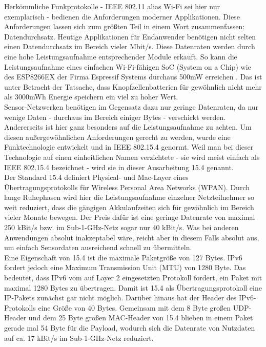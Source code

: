 Herkömmliche Funkprotokolle - IEEE 802.11 alias Wi-Fi sei hier nur exemplarisch - bedienen die Anforderungen moderner Applikationen. Diese Anforderungen lassen sich zum größten Teil in einem Wort zusammenfassen: Datendurchsatz. Heutige Applikationen für Endanwender benötigen nicht selten einen Datendurchsatz im Bereich vieler Mbit/s. Diese Datenraten werden durch eine hohe Leistungsaufnahme entsprechender Module erkauft. So kann die Leistungsaufnahme eines einfachen Wi-Fi-fähigen SoC (System on a Chip) wie des ESP8266EX der Firma Espressif Systems durchaus 500mW erreichen \cite{esp8266}. Das ist unter Betracht der Tatsache, dass Knopfzellenbatterien für gewöhnlich nicht mehr als 3000mWh Energie speichern ein viel zu hoher Wert. \\
Sensor-Netzwerken benötigen im Gegensatz dazu nur geringe Datenraten, da nur wenige Daten - durchaus im Bereich einiger Bytes - verschickt werden. Andererseits ist hier ganz besonders auf die Leistungsaufnahme zu achten. Um diesen außergewöhnlichen Anforderungen gerecht zu werden, wurde eine Funktechnologie entwickelt und in IEEE 802.15.4 genormt. Weil man bei dieser Technologie auf einen einheitlichen Namen verzichtete - sie wird meist einfach als IEEE 802.15.4 bezeichnet - wird sie in dieser Ausarbeitung 15.4 genannt. \\
Der Standard 15.4 definiert Physical- und Mac-Layer eines Übertragungsprotokolls für Wireless Personal Area Networks (WPAN). Durch lange Ruhephasen wird hier die Leistungsaufnahme einzelner Netzteilnehmer so weit reduziert, dass die gängigen Akkulaufzeiten sich für gewöhnlich im Bereich vieler Monate bewegen. Der Preis dafür ist eine geringe Datenrate von maximal 250 kBit/s bzw. im Sub-1-GHz-Netz sogar nur 40 kBit/s. Was bei anderen Anwendungen absolut inakzeptabel wäre, reicht aber in diesem Falls absolut aus, um einfach Sensordaten ausreichend schnell zu übermitteln. \\
Eine Eigenschaft von 15.4 ist die maximale Paketgröße von 127 Bytes. IPv6 fordert jedoch eine Maximum Transmission Unit (MTU) von 1280 Byte. Das bedeutet, dass IPv6 vom auf Layer 2 eingesetzten Protokoll fordert, ein Paket mit maximal 1280 Bytes zu übertragen. Damit ist 15.4 als Übertragungsprotokoll eine IP-Pakets zunächst gar nicht möglich. Darüber hinaus hat der Header des IPv6-Protokolls eine Größe von 40 Bytes. Gemeinsam mit dem 8 Byte großen UDP-Header und dem 25 Byte großen MAC-Header von 15.4 blieben in einem Paket gerade mal 54 Byte für die Payload, wodurch sich die Datenrate von Nutzdaten auf ca. 17 kBit/s im Sub-1-GHz-Netz reduziert.\cite{grundlagen6lowpan} \\

